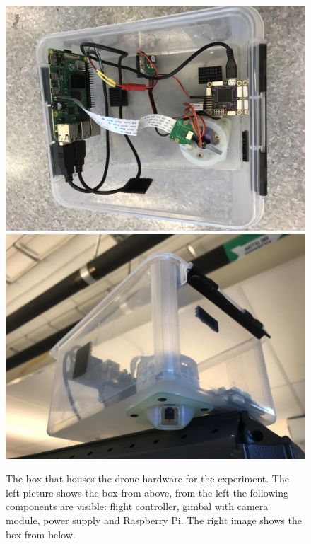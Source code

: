 \documentclass[nofilelist]{cslthse-msc}
\begin{document}
\begin{figure}[htp]
   \centering
   \includegraphics[width=.47\textwidth]{images/drone-box-1.jpg}\hfill
   \includegraphics[width=.47\textwidth]{images/drone-box-2.jpg}
   \caption{The box that houses the drone hardware for the experiment. The left picture shows the box from above, from the left the following components are visible: flight controller, gimbal with camera module, power supply and Raspberry Pi. The right image shows the box from below.}
   \label{fig:drone-setup}
\end{figure}
\end{document}
